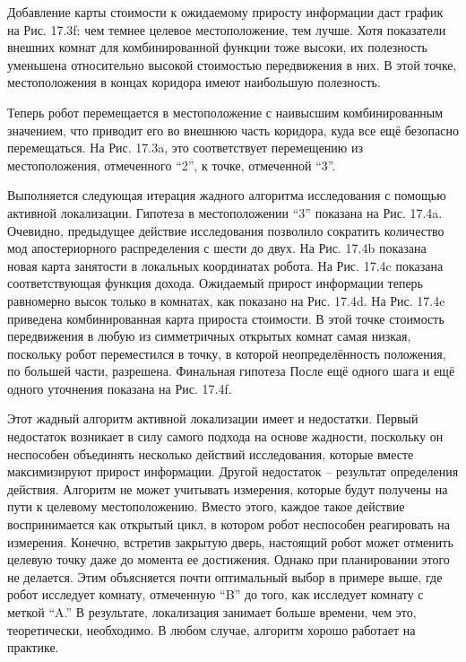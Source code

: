 \documentclass[10pt,a4paper]{article}
\begin{document}
Добавление карты стоимости к ожидаемому приросту информации даст график на Рис. 17.3f: чем темнее целевое местоположение, тем лучше. Хотя показатели внешних комнат для комбинированной функции тоже высоки, их полезность уменьшена относительно высокой стоимостью передвижения в них. В этой точке, местоположения в концах коридора имеют наибольшую полезность.

Теперь робот перемещается в местоположение с наивысшим комбинированным значением, что приводит его во внешнюю часть коридора, куда все ещё безопасно перемещаться. На Рис. 17.3a, это соответствует перемещению из местоположения, отмеченного “2”, к  точке, отмеченной “3”.

Выполняется следующая итерация жадного алгоритма исследования с помощью активной локализации. Гипотеза в местоположении “3” показана на Рис. 17.4a. Очевидно, предыдущее действие исследования позволило сократить количество мод апостериорного распределения с шести до двух. На Рис. 17.4b показана новая карта занятости в локальных координатах робота. На Рис. 17.4c показана соответствующая функция дохода. Ожидаемый прирост информации теперь равномерно высок только в комнатах, как показано на Рис. 17.4d. На Рис. 17.4e приведена комбинированная карта прироста стоимости. В этой точке стоимость передвижения в любую из симметричных открытых комнат самая низкая, поскольку робот переместился в точку, в которой неопределённость положения, по большей части, разрешена. Финальная гипотеза После ещё одного шага и ещё одного уточнения показана на Рис. 17.4f.

Этот жадный алгоритм активной локализации имеет и недостатки. Первый недостаток возникает в силу самого подхода на основе жадности, поскольку он неспособен объединять несколько действий исследования, которые вместе максимизируют прирост информации. Другой недостаток – результат определения действия. Алгоритм не может учитывать измерения, которые будут получены на пути к целевому местоположению. Вместо этого, каждое такое действие воспринимается как открытый цикл, в котором робот неспособен реагировать на измерения. Конечно, встретив закрытую дверь, настоящий робот может отменить целевую точку даже до момента ее достижения. Однако при планировании этого не делается. Этим объясняется почти оптимальный выбор в примере выше, где робот исследует комнату, отмеченную “B” до того, как исследует комнату с меткой “A.” В результате, локализация занимает больше времени, чем это, теоретически, необходимо. В любом случае, алгоритм хорошо работает на практике.\\
\end{document}
